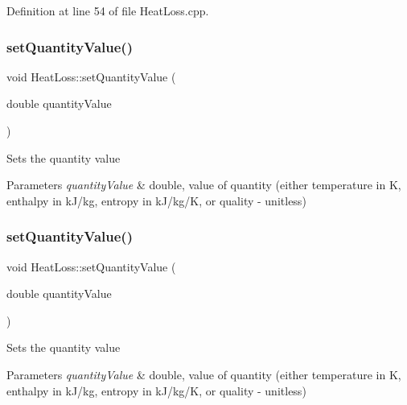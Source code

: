 Definition at line 54 of file Heat\+Loss.\+cpp.

\mbox{\label{class_heat_loss_ae6b6c4ac28471d7bc94e3886c48a90bd}} 
\subsubsection{\texorpdfstring{set\+Quantity\+Value()}{setQuantityValue()}\hspace{0.1cm}{\footnotesize\ttfamily [1/3]}}
{\footnotesize\ttfamily void Heat\+Loss\+::set\+Quantity\+Value (\begin{DoxyParamCaption}\item[{double}]{quantity\+Value }\end{DoxyParamCaption})}

Sets the quantity value 
\begin{DoxyParams}{Parameters}
{\em quantity\+Value} & double, value of quantity (either temperature in K, enthalpy in k\+J/kg, entropy in k\+J/kg/K, or quality -\/ unitless) \\
\hline
\end{DoxyParams}
\mbox{\label{class_heat_loss_ae6b6c4ac28471d7bc94e3886c48a90bd}} 
\subsubsection{\texorpdfstring{set\+Quantity\+Value()}{setQuantityValue()}\hspace{0.1cm}{\footnotesize\ttfamily [2/3]}}
{\footnotesize\ttfamily void Heat\+Loss\+::set\+Quantity\+Value (\begin{DoxyParamCaption}\item[{double}]{quantity\+Value }\end{DoxyParamCaption})}

Sets the quantity value 
\begin{DoxyParams}{Parameters}
{\em quantity\+Value} & double, value of quantity (either temperature in K, enthalpy in k\+J/kg, entropy in k\+J/kg/K, or quality -\/ unitless) \\
\hline
\end{DoxyParams}


